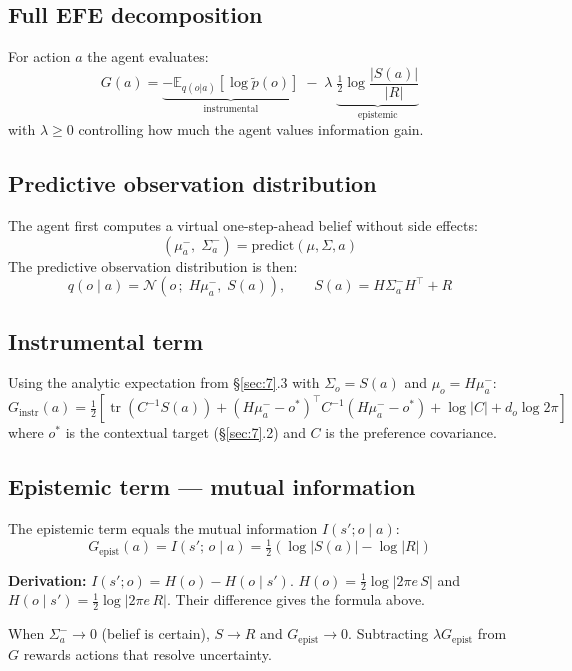 \documentclass[12pt, a4paper]{article}
\newcommand{\E}{\mathbb{E}}
\newcommand{\1}{\mathbf{1}}
\newcommand{\cN}{\mathcal{N}}
\newcommand{\tr}{\operatorname{tr}}
\begin{document}
\subsection{Full EFE decomposition}

For action $a$ the agent evaluates:
\[
G(a) =
\underbrace{-\E_{q(o|a)}[\log \tilde{p}(o)]}_{\text{instrumental}}
\;-\;
\lambda\;
\underbrace{\tfrac{1}{2}\log\frac{|S(a)|}{|R|}}_{\text{epistemic}}
\]
with $\lambda \ge 0$ controlling how much the agent values information gain.

\subsection{Predictive observation distribution}

The agent first computes a virtual one-step-ahead belief without side effects:
\[
(\mu^-_a,\;\Sigma^-_a) = \text{predict}(\mu, \Sigma, a)
\]
The predictive observation distribution is then:
\[
q(o \mid a) = \cN(o\,;\; H\mu^-_a,\; S(a)),
\qquad S(a) = H\Sigma^-_a H^\top + R
\]

\subsection{Instrumental term}

Using the analytic expectation from \S\ref{sec:7}.3 with $\Sigma_o = S(a)$ and
$\mu_o = H\mu^-_a$:
\[
G_\text{instr}(a)
= \tfrac{1}{2}\!\left[
  \tr(C^{-1} S(a))
  + (H\mu^-_a - o^*)^\top C^{-1}(H\mu^-_a - o^*)
  + \log|C| + d_o\log 2\pi
  \right]
\]
where $o^*$ is the contextual target (\S\ref{sec:7}.2) and $C$ is the preference
covariance.

\subsection{Epistemic term --- mutual information}

The epistemic term equals the mutual information $I(s'; o \mid a)$:
\[
G_\text{epist}(a)
= I(s';\,o\mid a)
= \tfrac{1}{2}\!\left(\log|S(a)| - \log|R|\right)
\]

\textbf{Derivation:}
$I(s';o) = H(o) - H(o \mid s')$.
$H(o) = \tfrac{1}{2}\log|2\pi e\, S|$ and
$H(o\mid s') = \tfrac{1}{2}\log|2\pi e\, R|$.
Their difference gives the formula above.

When $\Sigma^-_a \to 0$ (belief is certain), $S \to R$ and
$G_\text{epist} \to 0$.  Subtracting $\lambda G_\text{epist}$ from $G$ rewards
actions that resolve uncertainty.
\end{document}
